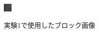 \documentclass[twocolumn, a4j]{jsarticle}
\begin{document}
\begin{figure}[]
\begin{minipage}[b]{0.49\linewidth}
    \includegraphics[width=0.9\columnwidth]{figure/block2.bmp}
    \label{fig:3-2}
  \end{minipage}
  \caption{実験1で使用したブロック画像}
\end{figure}
\end{document}
